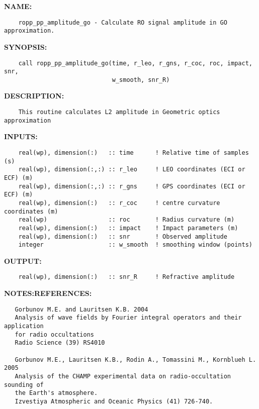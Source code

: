 \label{ch:robo67}
\label{ch:Preprocess_ropp_pp_amplitude_go}
\textbf{NAME:}\hspace{0.08in}\begin{Verbatim}
    ropp_pp_amplitude_go - Calculate RO signal amplitude in GO approximation.
\end{Verbatim}
\textbf{SYNOPSIS:}\hspace{0.08in}\begin{Verbatim}
    call ropp_pp_amplitude_go(time, r_leo, r_gns, r_coc, roc, impact, snr, 
                              w_smooth, snr_R)
\end{Verbatim}
\textbf{DESCRIPTION:}\hspace{0.08in}\begin{Verbatim}
    This routine calculates L2 amplitude in Geometric optics approximation
\end{Verbatim}
\textbf{INPUTS:}\hspace{0.08in}\begin{Verbatim}
    real(wp), dimension(:)   :: time      ! Relative time of samples (s)
    real(wp), dimension(:,:) :: r_leo     ! LEO coordinates (ECI or ECF) (m)
    real(wp), dimension(:,:) :: r_gns     ! GPS coordinates (ECI or ECF) (m)
    real(wp), dimension(:)   :: r_coc     ! centre curvature coordinates (m)
    real(wp)                 :: roc       ! Radius curvature (m)
    real(wp), dimension(:)   :: impact    ! Impact parameters (m)
    real(wp), dimension(:)   :: snr       ! Observed amplitude
    integer                  :: w_smooth  ! smoothing window (points)
\end{Verbatim}
\textbf{OUTPUT:}\hspace{0.08in}\begin{Verbatim}
    real(wp), dimension(:)   :: snr_R     ! Refractive amplitude
\end{Verbatim}
\textbf{NOTES:}\hspace{0.08in}\textbf{REFERENCES:}\hspace{0.08in}\begin{Verbatim}
   Gorbunov M.E. and Lauritsen K.B. 2004
   Analysis of wave fields by Fourier integral operators and their application
   for radio occultations
   Radio Science (39) RS4010

   Gorbunov M.E., Lauritsen K.B., Rodin A., Tomassini M., Kornblueh L. 2005 
   Analysis of the CHAMP experimental data on radio-occultation sounding of
   the Earth's atmosphere.
   Izvestiya Atmospheric and Oceanic Physics (41) 726-740.
\end{Verbatim}
